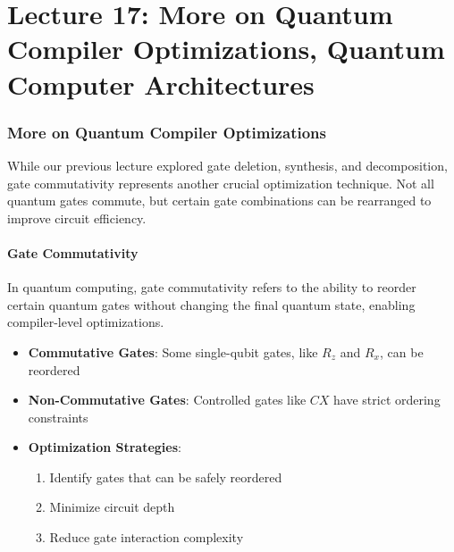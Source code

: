 \section{Lecture 17: More on Quantum Compiler Optimizations, Quantum Computer
Architectures}\label{sec:lecture17}

\subsubsection*{More on Quantum Compiler Optimizations}

While our previous lecture explored gate deletion, synthesis, and
decomposition, gate commutativity represents another crucial optimization
technique. Not all quantum gates commute, but certain gate combinations can
be rearranged to improve circuit efficiency.

\paragraph{Gate Commutativity}
In quantum computing, gate commutativity refers to the ability to reorder
certain quantum gates without changing the final quantum state, enabling
compiler-level optimizations.

\begin{itemize}
  \item \textbf{Commutative Gates}: Some single-qubit gates, like $R_z$ and
    $R_x$, can be reordered

  \item \textbf{Non-Commutative Gates}: Controlled gates like $CX$ have
    strict ordering constraints

  \item \textbf{Optimization Strategies}:
    \begin{enumerate}
      \item Identify gates that can be safely reordered
      \item Minimize circuit depth
      \item Reduce gate interaction complexity
    \end{enumerate}
\end{itemize}


